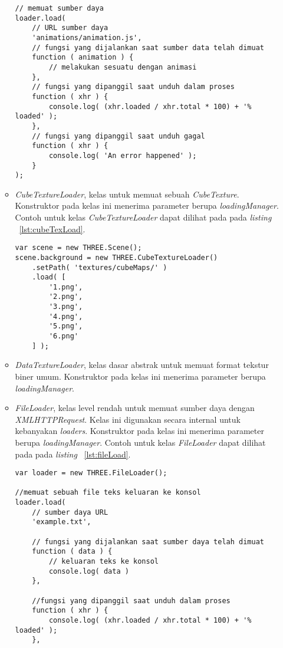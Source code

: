 \begin{itemize}
\begin{itemize}
\begin{lstlisting}[caption={Contoh penggunaan kelas {\it AnimationLoader}.}, label={lst:animationLoad},captionpos=b]
// memuat sumber daya
loader.load(
	// URL sumber daya
	'animations/animation.js',
	// fungsi yang dijalankan saat sumber data telah dimuat
	function ( animation ) {
		// melakukan sesuatu dengan animasi
	},
	// fungsi yang dipanggil saat unduh dalam proses
	function ( xhr ) {
		console.log( (xhr.loaded / xhr.total * 100) + '% loaded' );
	},
	// fungsi yang dipanggil saat unduh gagal
	function ( xhr ) {
		console.log( 'An error happened' );
	}
);
\end{lstlisting}
		\item {\it CubeTextureLoader}, kelas untuk memuat sebuah {\it CubeTexture}. Konstruktor pada kelas ini menerima parameter berupa  {\it loadingManager}. Contoh untuk kelas {\it CubeTextureLoader} dapat dilihat pada pada {\it listing} ~\ref{lst:cubeTexLoad}.
\begin{lstlisting}[caption={Contoh penggunaan kelas {\it CubeTextureLoader} menggunakan gambar dengan format PNG di setiap sisinya.}, label={lst:cubeTexLoad},captionpos=b]
var scene = new THREE.Scene();
scene.background = new THREE.CubeTextureLoader()
	.setPath( 'textures/cubeMaps/' )
	.load( [
		'1.png',
		'2.png',
		'3.png',
		'4.png',
		'5.png',
		'6.png'
	] );
\end{lstlisting}
		\item {\it DataTextureLoader}, kelas dasar abstrak untuk memuat format tekstur biner umum. Konstruktor pada kelas ini menerima parameter berupa  {\it loadingManager}.
		\item {\it FileLoader}, kelas level rendah untuk memuat sumber daya dengan {\it XMLHTTPRequest}. Kelas ini digunakan secara internal untuk kebanyakan {\it loaders}. Konstruktor pada kelas ini menerima parameter berupa  {\it loadingManager}. Contoh untuk kelas {\it FileLoader} dapat dilihat pada pada {\it listing} ~\ref{lst:fileLoad}.
\begin{lstlisting}[caption={Contoh penggunaan kelas {\it FileLoader} untuk berkas dengan format TXT.}, label={lst:fileLoad},captionpos=b]
var loader = new THREE.FileLoader();

//memuat sebuah file teks keluaran ke konsol
loader.load(
    // sumber daya URL
    'example.txt',

    // fungsi yang dijalankan saat sumber daya telah dimuat
    function ( data ) {
        // keluaran teks ke konsol
        console.log( data )
    },

    //fungsi yang dipanggil saat unduh dalam proses
    function ( xhr ) {
        console.log( (xhr.loaded / xhr.total * 100) + '% loaded' );
    },


\end{lstlisting}
\end{itemize}
\end{itemize}
